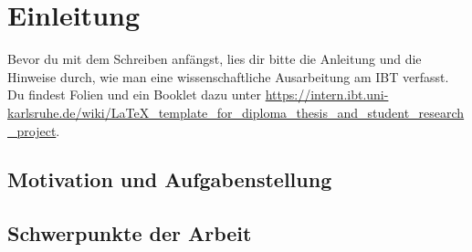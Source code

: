 \chapter{Einleitung}
\label{einleitung}
\thispagestyle{empty}

Bevor du mit dem Schreiben anf\"angst, lies dir bitte die Anleitung und die Hinweise durch, wie man eine wissenschaftliche Ausarbeitung am IBT verfasst. Du findest Folien und ein Booklet dazu unter \url{https://intern.ibt.uni-karlsruhe.de/wiki/LaTeX_template_for_diploma_thesis_and_student_research_project}.

\section{Motivation und Aufgabenstellung}
\label{motivation}

\section{Schwerpunkte der Arbeit}
\label{schwerpunkte}

